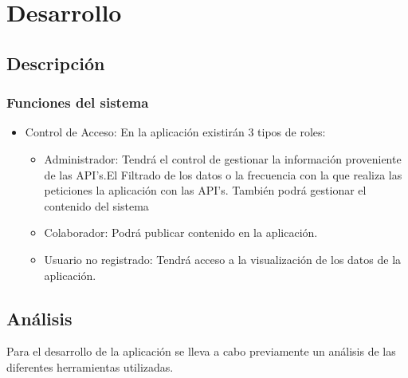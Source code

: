 
\chapter{Desarrollo}

\section{Descripción}

\subsection{Funciones del sistema}



\vspace{5 mm}

\begin{itemize}

\item Control de Acceso: En la aplicación existirán 3 tipos de roles:

\begin{itemize}
\item Administrador: Tendrá el control de gestionar la información proveniente de las API's.El Filtrado de los datos o la frecuencia con la que realiza las peticiones la aplicación con las API's.
También podrá gestionar el contenido del sistema
\item Colaborador: Podrá publicar contenido en la aplicación.
\item Usuario no registrado: Tendrá acceso a la visualización de los datos de la aplicación. 
\end{itemize}

\end{itemize}

\section{Análisis}

Para el desarrollo de la aplicación se lleva a cabo previamente un análisis de las diferentes herramientas utilizadas.

